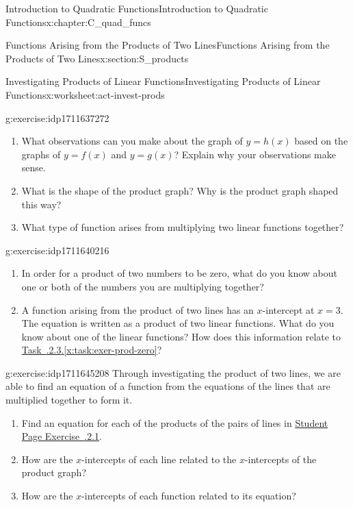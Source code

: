 \documentclass[oneside,10pt,]{book}
\newcommand{\xreffont}{\relax}
\numberwithin{equation}{chapter}
\begin{document}
\begin{chapterptx}{Introduction to Quadratic Functions}{}{Introduction to Quadratic Functions}{}{}{x:chapter:C_quad_funcs}
\begin{sectionptx}{Functions Arising from the Products of Two Lines}{}{Functions Arising from the Products of Two Lines}{}{}{x:section:S_products}
\begin{worksheet-subsection}{Investigating Products of Linear Functions}{}{Investigating Products of Linear Functions}{}{}{x:worksheet:act-invest-prods}
\begin{divisionexercise}{2}{}{}{g:exercise:idp1711637272}%
\begin{enumerate}[font=\bfseries,label=(\alph*),ref=\alph*]
\item{}What observations can you make about the graph of \(y = h(x)\) based on the graphs of \(y = f(x)\) and \(y = g(x)\)? Explain why your observations make sense.%
\item{}What is the shape of the product graph? Why is the product graph shaped this way?%
\item{}What type of function arises from multiplying two linear functions together?%
\end{enumerate}
\end{divisionexercise}%
\begin{divisionexercise}{3}{}{}{g:exercise:idp1711640216}%
\begin{enumerate}[font=\bfseries,label=(\alph*),ref=\alph*]
\item\label{x:task:exer-prod-zero}In order for a product of two numbers to be zero, what do you know about one or both of the numbers you are multiplying together?%
\item{}A function arising from the product of two lines has an \(x\)-intercept at \(x = 3\). The equation is written as a product of two linear functions. What do you know about one of the linear functions? How does this information relate to \hyperref[x:task:exer-prod-zero]{Task~{\xreffont 4.2.2.3}.{\xreffont\ref{x:task:exer-prod-zero}}}?%
\end{enumerate}
\end{divisionexercise}%
\begin{divisionexercise}{4}{}{}{g:exercise:idp1711645208}%
Through investigating the product of two lines, we are able to find an equation of a function from the equations of the lines that are multiplied together to form it.%
\begin{enumerate}[font=\bfseries,label=(\alph*),ref=\alph*]
\item{}Find an equation for each of the products of the pairs of lines in \hyperlink{x:exercise:exer-tbl-plot-prods}{Student Page Exercise~{\xreffont 4.2.2.1}}.%
\item{}How are the \(x\)-intercepts of each line related to the \(x\)-intercepts of the product graph?%
\item{}How are the \(x\)-intercepts of each function related to its equation?%
\end{enumerate}
\end{divisionexercise}%

\end{worksheet-subsection}
\end{sectionptx}
\end{chapterptx}
\end{document}
